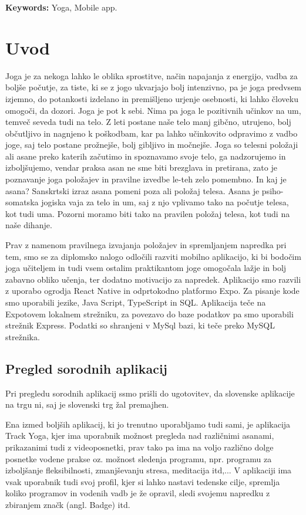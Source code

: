 \documentclass[a4paper, 12pt]{book}
\newcommand{\tkeywordsEn}{Yoga, Mobile app}
\newcommand{\clearemptydoublepage}{\newpage{\pagestyle{empty}\cleardoublepage}}
\begin{document}
\noindent\textbf{Keywords:} \tkeywordsEn.
\clearemptydoublepage

\mainmatter
\setcounter{page}{1}
\pagestyle{fancy}

\chapter{Uvod}
Joga je za nekoga lahko le oblika sprostitve, način napajanja z energijo, vadba za boljše počutje, za tiste, ki se z jogo ukvarjajo bolj intenzivno, pa je joga predvsem izjemno, do potankosti izdelano in premišljeno urjenje osebnosti, ki lahko človeku omogoči, da dozori. Joga je pot k sebi. Nima pa joga le pozitivnih učinkov na um, temveč seveda tudi na telo. 
Z leti postane naše telo manj gibčno, utrujeno, bolj občutljivo in nagnjeno k poškodbam, kar pa lahko učinkovito odpravimo z vadbo joge, saj telo postane prožnejše, bolj gibljivo in močnejše. Joga so telesni položaji ali asane preko katerih začutimo in spoznavamo svoje telo, ga nadzorujemo in izboljšujemo, vendar praksa asan ne sme biti brezglava in pretirana, zato je poznavanje joga položajev in pravilne izvedbe le-teh zelo pomembno. 
In kaj je asana? Sanskrtski izraz asana pomeni poza ali položaj telesa. Asana je psiho-somatska jogiska vaja za telo in um, saj z njo vplivamo tako na počutje telesa, kot tudi uma. Pozorni moramo biti tako na pravilen položaj telesa, kot tudi na naše dihanje. 

Prav z namenom pravilnega izvajanja položajev in spremljanjem napredka pri tem, smo se za diplomsko nalogo odločili razviti mobilno aplikacijo, ki bi bodočim joga učiteljem in tudi vsem ostalim praktikantom joge omogočala lažje in bolj zabavno obliko učenja, ter dodatno motivacijo za napredek. Aplikacijo smo razvili z uporabo ogrodja React Native in odprtokodno platformo Expo. Za pisanje kode smo uporabili jezike, Java Script, TypeScript in SQL. Aplikacija teče na Expotovem lokalnem strežniku, za povezavo do baze podatkov pa smo uporabili strežnik Express. Podatki so shranjeni v MySql bazi, ki teče preko MySQL strežnika.

\section{Pregled sorodnih aplikacij}
Pri pregledu sorodnih aplikacij ssmo prišli do ugotovitev, da slovenske aplikacije na trgu ni, saj je slovenski trg žal premajhen.

Ena izmed boljših aplikacij, ki jo trenutno uporabljamo tudi sami, je aplikacija Track Yoga, kjer ima uporabnik možnost pregleda nad različnimi asanami, prikazanimi tudi z videoposnetki, prav tako pa ima na voljo različno dolge posnetke vodene prakse oz. možnost sledenja programu, npr. programu za izboljšanje fleksibilnosti, zmanjševanju stresa, meditacija itd,... V aplikaciji ima vsak uporabnik tudi svoj profil, kjer si lahko nastavi tedenske cilje, spremlja koliko programov in vodenih vadb je že opravil, sledi svojemu napredku z zbiranjem značk (angl. Badge) itd. 
\end{document}
